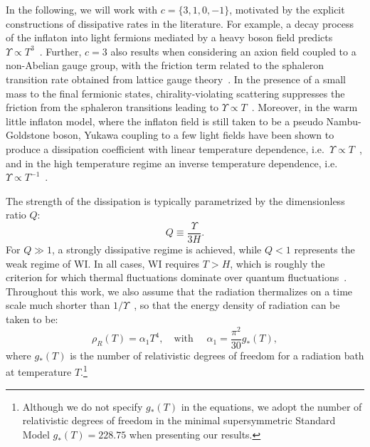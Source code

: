\documentclass[a4paper,11pt]{article}
\begin{document}
In the following, we will work with $c=\{3,1,0,-1\}$, motivated by the explicit constructions of dissipative rates in the literature. For example, a decay process of the inflaton into light fermions mediated by a heavy boson field predicts $\Upsilon \propto T^3$~\cite{Moss:2006gt}. Further, $c=3$ also results  when considering an axion field coupled to a non-Abelian gauge group, with the friction term related to the sphaleron transition rate obtained from lattice gauge theory~\cite{Moore:2010jd, Laine:2016hma}. In the presence of a small mass to the final fermionic states, chirality-violating scattering suppresses the friction from the sphaleron transitions leading to $\Upsilon \propto T$~\cite{Berghaus:2020ekh}. Moreover, in the warm little inflaton model, where the inflaton field is still taken to be a pseudo Nambu-Goldstone boson, Yukawa coupling to a few light fields have been shown to produce a dissipation coefficient
with linear temperature dependence, i.e.\ $\Upsilon\propto T$~\cite{Bastero-Gil:2016qru}, and in the high temperature regime an inverse
temperature dependence, i.e.\ $\Upsilon \propto T^{-1}$~\cite{Bastero-Gil:2019gao}. 

The strength of the dissipation is typically parametrized by the dimensionless ratio $Q$:
\begin{equation}
    Q\equiv \frac{\Upsilon}{3H}.
\end{equation}
For $Q\gg1$, a strongly dissipative regime is achieved, while $Q < 1$ represents the weak regime of WI. In all cases, WI requires $T>H$, which is roughly the criterion for which thermal fluctuations dominate over quantum fluctuations~\cite{Berera:1995ie}. Throughout this work, we also assume that the radiation thermalizes on a time scale much shorter than $1/\Upsilon$~\cite{Berera:1995wh,Berera:1995ie}, so that the energy density of radiation can be taken to be:
\begin{equation}
    \rho_R(T)=\alpha_1 T^4, \quad \text{with } \quad \alpha_1=\frac{\pi^2}{30}g_{*}(T), \label{eq:WI.3}
\end{equation}
where $g_{*}(T)$ is the number of relativistic degrees of freedom for a radiation bath at temperature $T$.\footnote{Although we do not specify $g_{*}(T)$ in the equations, we adopt the number of relativistic degrees of freedom in the minimal supersymmetric Standard Model $g_{*}(T) = 228.75$ when presenting our results.}
\end{document}
